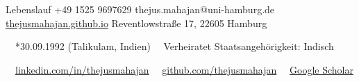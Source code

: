 \documentclass{thejus_cv}
\begin{document}
         {Lebenslauf}
         {+49 1525 9697629}
         {thejus.mahajan@uni-hamburg.de}
         {\href{https://thejusmahajan.github.io}{thejusmahajan.github.io}}
         {Reventlowstra{\ss}e 17, 22605 Hamburg}

\vspace{-0.5cm}
{\small\color{white}
\faCalendar\ \ *30.09.1992 (Talikulam, Indien) \hspace{0.5cm} \faUser\ \ Verheiratet \hspace{0.5cm} Staatsangeh\"origkeit: Indisch
}\par
\vspace{0.1cm}
{\small\color{white}
\faLinkedin\ \ \href{https://www.linkedin.com/in/thejusmahajan/}{linkedin.com/in/thejusmahajan}
\hspace{0.5cm}
\faGithub\ \ \href{https://github.com/thejusmahajan}{github.com/thejusmahajan}
\hspace{0.5cm}
\faGraduationCap\ \ \href{https://scholar.google.com/citations?user=PJkZwAwAAAAJ}{Google Scholar}
}\par
\vspace{0.1cm}
\end{document}
